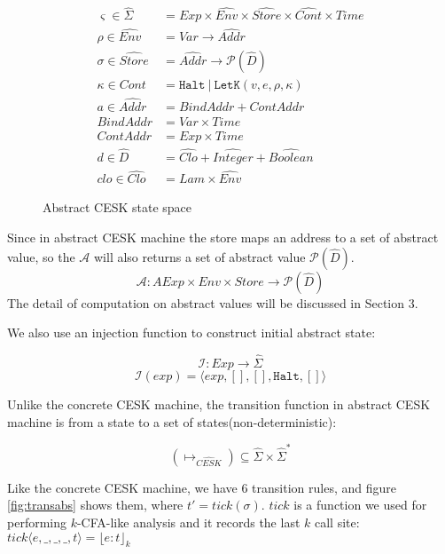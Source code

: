 \documentclass[paper=a4, fontsize=11pt]{scrartcl} %
\numberwithin{equation}{section} %
\numberwithin{figure}{section} %
\numberwithin{table}{section} %
\begin{document}
\begin{figure}[h!]
\begin{align*}
\varsigma \in \widehat{\Sigma} & = Exp \times \widehat{Env} \times \widehat{Store} \times \widehat{Cont} \times Time \\
\rho \in \widehat{Env} & = Var \rightarrow \widehat{Addr} \\
\sigma \in \widehat{Store} & = \widehat{Addr} \rightarrow \mathcal{P}(\hat{D}) \\
\kappa \in Cont & = \texttt{Halt} ~|~ \texttt{LetK}(v,e,\rho,\kappa) \\
a \in \widehat{Addr} & = BindAddr + ContAddr \\
BindAddr &= Var \times Time \\
ContAddr &= Exp \times Time \\
d \in \hat{D} & = \widehat{Clo} + \widehat{Integer} + \widehat{Boolean} \\
clo \in \widehat{Clo} & = Lam \times \widehat{Env}
\end{align*}
\caption{Abstract CESK state space}
\label{fig:abstractcesk}
\end{figure}

Since in abstract CESK machine the store maps an address to a set of abstract value, so the $\mathcal{A}$ will also returns a set of abstract value $\mathcal{P}(\hat{D})$. 
$$ \mathcal{A} : AExp \times Env \times Store \rightarrow \mathcal{P}(\hat{D}) $$
The detail of computation on abstract values will be discussed in Section 3.

We also use an injection function to construct initial abstract state:

$$ \mathcal{I} : Exp \rightarrow \widehat{\Sigma} $$
$$ \mathcal{I}(exp) = \langle exp, [], [], \texttt{Halt}, [] \rangle $$

Unlike the concrete CESK machine, the transition function in abstract CESK machine is from a state to a set of states(non-deterministic):

$$(\longmapsto_{\widehat{CESK}}) \subseteq \widehat{\Sigma} \times \widehat{\Sigma}^{*}$$

Like the concrete CESK machine, we have 6 transition rules, and figure \ref{fig:transabs} shows them, where $t' = tick(\sigma)$. $tick$ is a function we used for performing $k$-CFA-like analysis and it records the last $k$ call site: $tick \langle e, \_, \_, \_, t \rangle = {\lfloor e : t \rfloor}_{k} $
\end{document}
